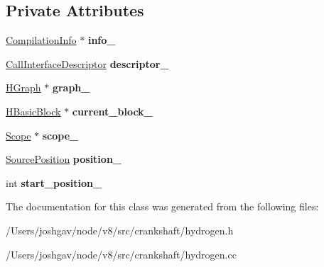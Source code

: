 \subsection*{Private Attributes}
\begin{DoxyCompactItemize}
\item 
\hyperlink{classv8_1_1internal_1_1_compilation_info}{Compilation\+Info} $\ast$ {\bfseries info\+\_\+}\hypertarget{classv8_1_1internal_1_1_h_graph_builder_a68c2c7b5ab3e0ab3a3a0963106de5158}{}\label{classv8_1_1internal_1_1_h_graph_builder_a68c2c7b5ab3e0ab3a3a0963106de5158}

\item 
\hyperlink{classv8_1_1internal_1_1_call_interface_descriptor}{Call\+Interface\+Descriptor} {\bfseries descriptor\+\_\+}\hypertarget{classv8_1_1internal_1_1_h_graph_builder_ab94c291b1ba37c395d5e222289c4a28c}{}\label{classv8_1_1internal_1_1_h_graph_builder_ab94c291b1ba37c395d5e222289c4a28c}

\item 
\hyperlink{classv8_1_1internal_1_1_h_graph}{H\+Graph} $\ast$ {\bfseries graph\+\_\+}\hypertarget{classv8_1_1internal_1_1_h_graph_builder_a2e629ab7aa1708617de20909f851f9da}{}\label{classv8_1_1internal_1_1_h_graph_builder_a2e629ab7aa1708617de20909f851f9da}

\item 
\hyperlink{classv8_1_1internal_1_1_h_basic_block}{H\+Basic\+Block} $\ast$ {\bfseries current\+\_\+block\+\_\+}\hypertarget{classv8_1_1internal_1_1_h_graph_builder_ae43bf49351ca7c717493fd37bf01ed88}{}\label{classv8_1_1internal_1_1_h_graph_builder_ae43bf49351ca7c717493fd37bf01ed88}

\item 
\hyperlink{classv8_1_1internal_1_1_scope}{Scope} $\ast$ {\bfseries scope\+\_\+}\hypertarget{classv8_1_1internal_1_1_h_graph_builder_ac3746d315a55ad0ea9715318c9bf309f}{}\label{classv8_1_1internal_1_1_h_graph_builder_ac3746d315a55ad0ea9715318c9bf309f}

\item 
\hyperlink{classv8_1_1internal_1_1_source_position}{Source\+Position} {\bfseries position\+\_\+}\hypertarget{classv8_1_1internal_1_1_h_graph_builder_ab07ccab111ed862e78ecdbaef1afa6f2}{}\label{classv8_1_1internal_1_1_h_graph_builder_ab07ccab111ed862e78ecdbaef1afa6f2}

\item 
int {\bfseries start\+\_\+position\+\_\+}\hypertarget{classv8_1_1internal_1_1_h_graph_builder_aa5061cbabc1f384090870b2f69c575a4}{}\label{classv8_1_1internal_1_1_h_graph_builder_aa5061cbabc1f384090870b2f69c575a4}

\end{DoxyCompactItemize}


The documentation for this class was generated from the following files\+:\begin{DoxyCompactItemize}
\item 
/\+Users/joshgav/node/v8/src/crankshaft/hydrogen.\+h\item 
/\+Users/joshgav/node/v8/src/crankshaft/hydrogen.\+cc\end{DoxyCompactItemize}
